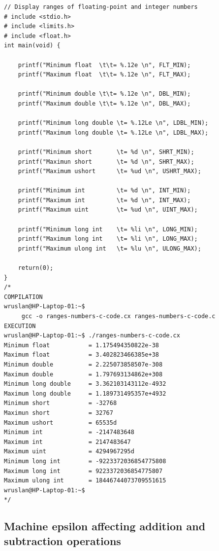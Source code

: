 \begin{lstlisting}[caption={Display ranges of floating-point and integer numbers}, label=lst-Display ranges of floating-point and integer numbers]	
// Display ranges of floating-point and integer numbers
# include <stdio.h>
# include <limits.h> 
# include <float.h>
int main(void) {
	
	printf("Minimum float  \t\t= %.12e \n", FLT_MIN);
	printf("Maximum float  \t\t= %.12e \n", FLT_MAX);
	
	printf("Minimum double \t\t= %.12e \n", DBL_MIN);
	printf("Maximum double \t\t= %.12e \n", DBL_MAX);
	
	printf("Minimum long double \t= %.12Le \n", LDBL_MIN);
	printf("Maximum long double \t= %.12Le \n", LDBL_MAX);
	
	printf("Minimum short       \t= %d \n", SHRT_MIN);
	printf("Maximun short       \t= %d \n", SHRT_MAX);
	printf("Maximum ushort      \t= %ud \n", USHRT_MAX);
	
	printf("Minimum int         \t= %d \n", INT_MIN);
	printf("Maximum int         \t= %d \n", INT_MAX);
	printf("Maximum uint        \t= %ud \n", UINT_MAX);
	
	printf("Minimum long int    \t= %li \n", LONG_MIN);
	printf("Maximum long int    \t= %li \n", LONG_MAX);
	printf("Maximum ulong int   \t= %lu \n", ULONG_MAX);
	
	return(0);
}
/*
COMPILATION
wruslan@HP-Laptop-01:~$ 
     gcc -o ranges-numbers-c-code.cx ranges-numbers-c-code.c 
EXECUTION
wruslan@HP-Laptop-01:~$ ./ranges-numbers-c-code.cx 
Minimum float           = 1.175494350822e-38 
Maximum float           = 3.402823466385e+38 
Minimum double          = 2.225073858507e-308 
Maximum double          = 1.797693134862e+308 
Minimum long double 	= 3.362103143112e-4932 
Maximum long double 	= 1.189731495357e+4932 
Minimum short       	= -32768 
Maximun short       	= 32767 
Maximum ushort      	= 65535d 
Minimum int         	= -2147483648 
Maximum int         	= 2147483647 
Maximum uint        	= 4294967295d 
Minimum long int    	= -9223372036854775808 
Maximum long int    	= 9223372036854775807 
Maximum ulong int   	= 18446744073709551615 
wruslan@HP-Laptop-01:~$ 
*/
\end{lstlisting}


\clearpage
\pagebreak

\subsection{Machine epsilon affecting addition and subtraction operations}
\label{app4-Machine epsilon affecting addition and subtraction operations}

